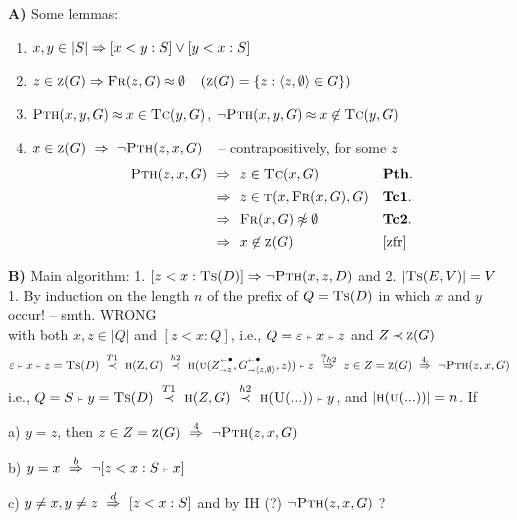 \documentclass[leqno]{article}
\newcommand{\func}[1]{\mbox{\sc #1}}
\newcommand{\f}[1]{\func{#1}}
\newcommand{\aft}[3]{[#1<#2:#3]}
\newcommand{\by}[2]{\ \stackrel{#2}{#1}\ }
\newcommand{\who}{\mbox{?}}
\begin{document}
%
{\bf A)} Some  lemmas: 
 \begin{enumerate}
  \item $x,y\in|S| \impl \aft xyS \lor \aft yxS$
  \item\label{zfr} 
     $z\in \f z(G)\impl \f{Fr}(z,G)\Eq\es$\ \ $(\f z(G)=\{z:\<z,\es\>\in G\})$
  \item $\f{Pth}(x,y,G)\Eq x\in\f{Tc}(y,G)$,\hfill
 $\neg\f{Pth}(x,y,G)\Eq x\not\in\f{Tc}(y,G)$
\item 
$x\in \f z(G)\ \impl\ \neg \f{Pth}(z,x,G)$\ \ -- contrapositively, for some $z$ \\
\[\begin{array}{r@{\ \ \impl\ \ }l@{\ \ \ }l}
\f{Pth}(z,x,G) & z\in \f{Tc}(x,G) & {\bf Pth.} \\[1ex]
       & z\in \f{t}(x,\f{Fr}(x,G),G) & {\bf Tc1.} \\[1ex]
       & \f{Fr}(x,G)\notEq\es & {\bf Tc2.} \\[1ex]
       & x\not\in \f z(G) & \ref{zfr}
\end{array}
\]
 \end{enumerate}
{\bf B)} Main algorithm:
1. $\aft zx{\f{Ts}(D)}\impl \neg \f{Pth}(x,z,D)$ and 
2. $|\f{Ts}(E,V)|  =  V $
\\[1ex]
1. By induction on the length $n$ of the prefix of $Q=\f{Ts}(D)$ in which 
  $x$ and $y$ occur!  -- smth. WRONG \\
 with both $x,z\in|Q|$ and $\aft zxQ$, i.e., $Q=\varepsilon\mathrel{\scriptscriptstyle{\vdash}} x\mathrel{\scriptscriptstyle{\vdash}} z$ and $Z\Incl \f z(G)$
\[\estr\app x\app z =\f{Ts}(D) \by\Incl{T1} \f h(\f Z,G) \by\Incl{h2} \f h(\f u(\rem Zz,\rem G{\<z,\es\>},z))\app z
\by\impl{\who h2} z\in Z = \f z(G) \by\impl{4.}\neg\f{Pth}(z,x,G) \]
%
 i.e., $Q=S\app y
 = \f{Ts}(D) \by\Incl{T1} \f h(Z,G) \by\Incl{h2} \f h(\f U(...))\app y$, 
and $|\f h(\f u(...))|=n$. If 

a) $y=z$, then $z\in Z=\f z(G)\by\impl 4 \neg\f{Pth}(z,x,G)$ 

b) $y=x \by\impl{b} \neg\aft zx{S\app x}$ 

c) $y\not=x, y\not=z \by\impl{d}\aft zxS$ and by IH (?) $\neg\f{Pth}(z,x,G)$ ?


\newpage
\end{document}
